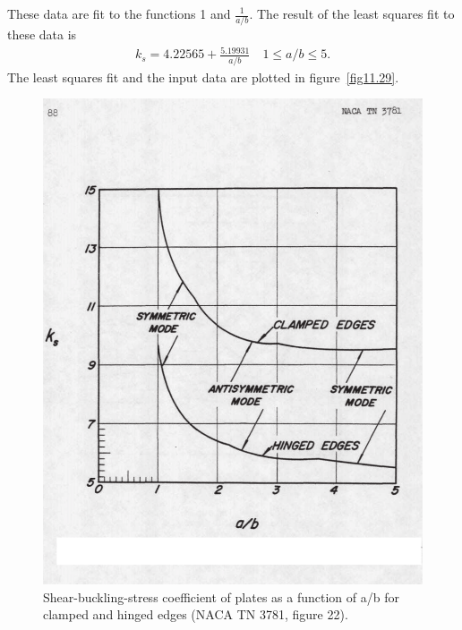 \documentclass{AeroStructure-ERJohnson}
\begin{document}
These data are fit to the functions 1 and $\frac{1}{a/b}$. The result of the least squares fit to these data is
\begin{align}\label{eq11.117}
k_{s}=4.22565+\frac{5.19931}{a/b} \quad 1 \leq a/b \leq 5.
\end{align}
The least squares fit and the input data are plotted in figure~\ref{fig11.29}.


\clearpage

\begin{figure}
\vspace*{-1.4pc}
\centerline{\includegraphics{Figure_11-30.pdf}}
\caption{Shear-buckling-stress coefficient of plates as a function of a/b for clamped and hinged edges (NACA TN 3781, figure 22).} \label{fig11.30}
\vspace*{1.4pc}
\end{figure}
\end{document}
